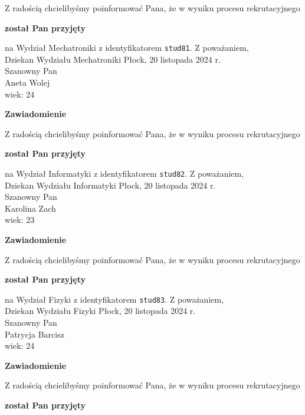 \documentclass[12pt,a4paper]{article}
\begin{document}
\bigskip
Z radością chcielibyśmy poinformować Pana, że w wyniku procesu rekrutacyjnego 
\begin{center}
\textsf{\textbf{został Pan przyjęty}} 
\end{center}
na Wydział Mechatroniki z identyfikatorem \verb|stud81|. 
\vspace{2cm}
\noindent
Z poważaniem,\\
Dziekan
Wydziału Mechatroniki
\newpage
\hfill Płock, 20 listopada 2024 r.\\
\noindent 
Szanowny Pan \\
Aneta Wolej \\
wiek: 24
\bigskip
\begin{center}
 	{\Large\textbf{Zawiadomienie}}
\end{center}
\bigskip
Z radością chcielibyśmy poinformować Pana, że w wyniku procesu rekrutacyjnego 
\begin{center}
\textsf{\textbf{został Pan przyjęty}} 
\end{center}
na Wydział Informatyki z identyfikatorem \verb|stud82|. 
\vspace{2cm}
\noindent
Z poważaniem,\\
Dziekan
Wydziału Informatyki
\newpage
\hfill Płock, 20 listopada 2024 r.\\
\noindent 
Szanowny Pan \\
Karolina Zach \\
wiek: 23
\bigskip
\begin{center}
 	{\Large\textbf{Zawiadomienie}}
\end{center}
\bigskip
Z radością chcielibyśmy poinformować Pana, że w wyniku procesu rekrutacyjnego 
\begin{center}
\textsf{\textbf{został Pan przyjęty}} 
\end{center}
na Wydział Fizyki z identyfikatorem \verb|stud83|. 
\vspace{2cm}
\noindent
Z poważaniem,\\
Dziekan
Wydziału Fizyki
\newpage
\hfill Płock, 20 listopada 2024 r.\\
\noindent 
Szanowny Pan \\
Patrycja Barcisz \\
wiek: 24
\bigskip
\begin{center}
 	{\Large\textbf{Zawiadomienie}}
\end{center}
\bigskip
Z radością chcielibyśmy poinformować Pana, że w wyniku procesu rekrutacyjnego 
\begin{center}
\textsf{\textbf{został Pan przyjęty}} 
\end{center}
\end{document}

